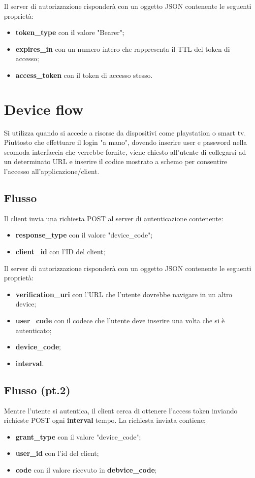 \noindent Il server di autorizzazione risponderà con un oggetto JSON contenente le seguenti proprietà:
\begin{itemize}
    \item \textbf{token\_type} con il valore "Bearer";
    \item \textbf{expires\_in} con un numero intero che rappresenta il TTL del token di accesso;
    \item \textbf{access\_token} con il token di accesso stesso.
\end{itemize}

\section{Device flow}
Si utilizza quando si accede a risorse da dispositivi come playstation o smart tv. Piuttosto che effettuare il login "a mano", dovendo inserire user e password nella scomoda interfaccia che verrebbe fornite, viene chiesto all'utente di collegarsi ad un determinato URL e inserire il codice mostrato a schemo per consentire l'accesso all'applicazione/client.

\subsection{Flusso}
Il client invia una richiesta POST al server di autenticazione contenente:
\begin{itemize}
    \item \textbf{response\_type} con il valore "device\_code";
    \item \textbf{client\_id} con l'ID del client;
\end{itemize}

\noindent Il server di autorizzazione risponderà con un oggetto JSON contenente le seguenti proprietà:
\begin{itemize}
    \item \textbf{verification\_uri} con l'URL che l'utente dovrebbe navigare in un altro device;
    \item \textbf{user\_code} con il codece che l'utente deve inserire una volta che si è autenticato;
    \item \textbf{device\_code};
    \item \textbf{interval}.
\end{itemize}

\subsection{Flusso (pt.2)}
Mentre l'utente si autentica, il client cerca di ottenere l'access token inviando richieste POST ogni \textbf{interval} tempo. La richiesta inviata contiene:
\begin{itemize}
    \item \textbf{grant\_type} con il valore "device\_code";
    \item \textbf{user\_id} con l'id del client;
    \item \textbf{code} con il valore ricevuto in \textbf{debvice\_code};
\end{itemize}

